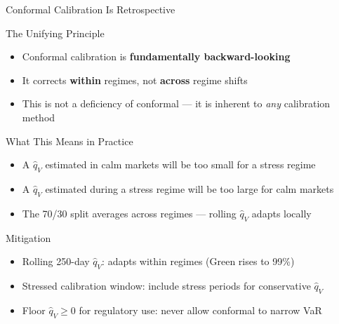 \documentclass[9pt, aspectratio=169, t]{beamer}
\newcommand{\qV}{\hat{q}_V}
\begin{document}
\begin{frame}{Conformal Calibration Is Retrospective}
	\vspace{-0.3cm}
	{\footnotesize
	\begin{block}{The Unifying Principle}
		\begin{itemize}\setlength{\itemsep}{1pt}
			\item Conformal calibration is \textbf{fundamentally backward-looking}
			\item It corrects \textbf{within} regimes, not \textbf{across} regime shifts
			\item This is not a deficiency of conformal --- it is inherent to \emph{any} calibration method
		\end{itemize}
	\end{block}
	\vspace{0mm}
	\begin{alertblock}{What This Means in Practice}
		\begin{itemize}\setlength{\itemsep}{1pt}
			\item A $\qV$ estimated in calm markets will be too small for a stress regime
			\item A $\qV$ estimated during a stress regime will be too large for calm markets
			\item The 70/30 split averages across regimes --- rolling $\qV$ adapts locally
		\end{itemize}
	\end{alertblock}
	\vspace{0mm}
	\begin{block}{Mitigation}
		\begin{itemize}\setlength{\itemsep}{1pt}
			\item Rolling 250-day $\qV$: adapts within regimes (Green rises to 99\%)
			\item Stressed calibration window: include stress periods for conservative $\qV$
			\item Floor $\qV \geq 0$ for regulatory use: never allow conformal to narrow VaR
		\end{itemize}
	\end{block}
	}
\end{frame}
\end{document}
